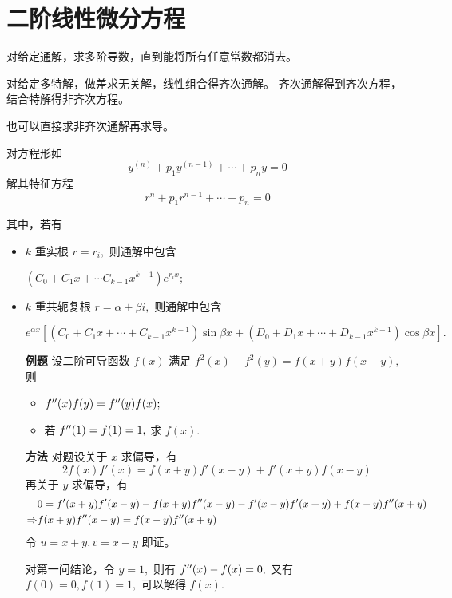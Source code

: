 \section{二阶线性微分方程}


对给定通解，求多阶导数，直到能将所有任意常数都消去。

对给定多特解，做差求无关解，线性组合得齐次通解。
齐次通解得到齐次方程，结合特解得非齐次方程。

也可以直接求非齐次通解再求导。


对方程形如
$$
    y^{(n)} + p_1y^{(n-1)} + \cdots + p_ny = 0
$$
解其特征方程 
$$
    r^n + p_1r^{n-1} + \cdots + p_n = 0
$$

其中，若有
\begin{itemize}
    \item $ k $ 重实根 $ r = r_i, $ 则通解中包含 
    
    $ (C_0 + C_1x + \cdots C_{k-1}x^{k-1})e^{r_ix}; $ 
    \item $ k $ 重共轭复根 $ r = \alpha \pm \beta i, $ 则通解中包含
    
    $ e^{\alpha x}
    [(C_0+C_1x+\cdots+C_{k-1}x^{k-1})\sin\beta x + (D_0+D_1x+\cdots+D_{k-1}x^{k-1})\cos\beta x]. $
\end{itemize}


\begin{enumerate}
    \item[\textbf{例题}] 设二阶可导函数 $ f(x) $ 满足
    $ f^2(x) - f^2(y) = f(x+y)f(x-y), $ 则
    \begin{itemize}
        \item $ f^{\prime\prime}(x)f(y) = f^{\prime\prime}(y)f(x); $ 
        \item 若 $ f^{\prime\prime}(1) = f(1) = 1, $ 求 $ f(x). $ 
    \end{itemize}
    \item[\textbf{方法}] 
    对题设关于 $ x $ 求偏导，有
    $$
        2f(x)f'(x) = f(x+y)f'(x-y) +f'(x+y)f(x-y)
    $$
    再关于 $ y $ 求偏导，有
    \begin{equation*}
        \begin{aligned}
            &0 = f'(x+y)f'(x-y) - f(x+y)f^{\prime\prime}(x-y) - f'(x-y)f'(x+y) + f(x-y)f^{\prime\prime}(x+y)\\
            \Rightarrow &f(x+y)f^{\prime\prime}(x-y) = f(x-y)f^{\prime\prime}(x+y)    
        \end{aligned}
    \end{equation*}
    令 $ u = x+y, v = x-y $ 即证。

    对第一问结论，令 $ y = 1, $ 则有 $ f^{\prime\prime}(x) - f(x) = 0, $ 
    又有 $ f(0) = 0,f(1) = 1, $ 可以解得 $ f(x). $ 
\end{enumerate}

